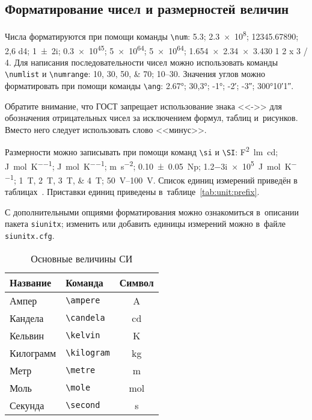 \subsection{Форматирование чисел и размерностей величин}\label{sec:units}

Числа форматируются при помощи команды \verb|\num|:
\num{5,3};
\num{2,3e8};
\num{12345,67890};
\num{2,6 d4};
\num{1+-2i};
\num{.3e45};
\num[exponent-base=2]{5 e64};
\num[exponent-base=2,exponent-to-prefix]{5 e64};
\num{1.654 x 2.34 x 3.430}
\num{1 2 x 3 / 4}.
Для написания последовательности чисел можно использовать команды \verb|\numlist| и \verb|\numrange|:
\numlist{10;30;50;70}; \numrange{10}{30}.
Значения углов можно форматировать при помощи команды \verb|\ang|:
\ang{2.67};
\ang{30,3};
\ang{-1;;};
\ang{;-2;};
\ang{;;-3};
\ang{300;10;1}.

Обратите внимание, что ГОСТ запрещает использование знака <<->> для обозначения отрицательных чисел
за исключением формул, таблиц и~рисунков.
Вместо него следует использовать слово <<минус>>.

Размерности можно записывать при помощи команд \verb|\si| и \verb|\SI|:
\si{\farad\squared\lumen\candela};
\si{\joule\per\mole\per\kelvin};
\si[per-mode = symbol-or-fraction]{\joule\per\mole\per\kelvin};
\si{\metre\per\second\squared};
\SI{0.10(5)}{\neper};
\SI{1.2-3i e5}{\joule\per\mole\per\kelvin};
\SIlist{1;2;3;4}{\tesla};
\SIrange{50}{100}{\volt}.
Список единиц измерений приведён в таблицах~.
Приставки единиц приведены в~таблице~\ref{tab:unit:prefix}.

С дополнительными опциями форматирования можно ознакомиться в~описании пакета \texttt{siunitx};
изменить или добавить единицы измерений можно в~файле \texttt{siunitx.cfg}.

\begin{table}
    \centering
    \captionstyle{\centering}
    \caption{Основные величины СИ}\label{tab:unit:base}
    \begin{tabular}{llc}
        \toprule
        Название  & Команда                & Символ         \\
        \midrule
        Ампер     & \verb|\ampere| & \si{\ampere}   \\
        Кандела   & \verb|\candela| & \si{\candela}  \\
        Кельвин   & \verb|\kelvin| & \si{\kelvin}   \\
        Килограмм & \verb|\kilogram| & \si{\kilogram} \\
        Метр      & \verb|\metre| & \si{\metre}    \\
        Моль      & \verb|\mole| & \si{\mole}     \\
        Секунда   & \verb|\second| & \si{\second}   \\
        \bottomrule
    \end{tabular}
\end{table}

